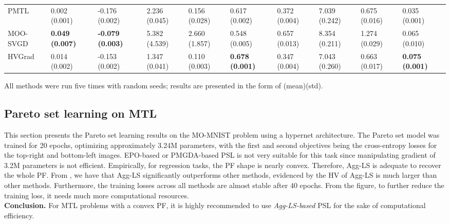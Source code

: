 \begin{table}[]
\begin{threeparttable}
\begin{tabular}{l|l|l|l|l|l|l|l|l|l}
PMTL                         & 0.002 (0.001)     & -0.176 (0.002)     & 2.236 (0.045)     & 0.156 (0.028)     & 0.617 (0.002)     & 0.372 (0.004)     & 7.039 (0.242)     & 0.675 (0.016)     & 0.035 (0.001)     \\ 
MOO-SVGD                     & \textbf{0.049 (0.007)} & \textbf{-0.079 (0.003)} & 5.382 (4.539)     & 2.660 (1.857)     & 0.548 (0.005)     & 0.657 (0.013)     & 8.354 (0.211)     & 1.274 (0.029)     & 0.065 (0.010)     \\ 
HVGrad                       & 0.014 (0.002)     & -0.153 (0.002)     & 1.347 (0.041)     & 0.110 (0.003)     & \textbf{0.678 (0.001)} & 0.347 (0.004)     & 7.043 (0.260)     & 0.663 (0.017)     & \textbf{0.075 (0.001)} \\
\bottomrule
\end{tabular}
\begin{tablenotes}
    \small
    \item All methods were run five times with random seeds; results are presented in the form of (mean)(std).
\end{tablenotes}
\end{threeparttable}
\end{table}

\subsection{Pareto set learning on MTL}
This section presents the Pareto set learning results on the MO-MNIST problem using a hypernet architecture. The Pareto set model was trained for 20 epochs, optimizing approximately 3.24M parameters, with the first and second objectives being the cross-entropy losses for the top-right and bottom-left images. EPO-based or PMGDA-based PSL is not very suitable for this task since manipulating gradient of 3.2M parameters is not efficient. 
Empirically, for regression tasks, the PF shape is nearly convex. Therefore, Agg-LS is adequate to recover the whole PF. From , we have that Agg-LS significantly outperforms other methods, evidenced by the HV of Agg-LS is much larger than other methods. Furthermore, the training losses across all methods are almost stable after 40 epochs. From the figure, to further reduce the training loss, it needs much more computational resources. \\
\textbf{Conclusion.} For MTL problems with a convex PF, it is highly recommended to use \emph{Agg-LS-based} PSL for the sake of computational efficiency.

